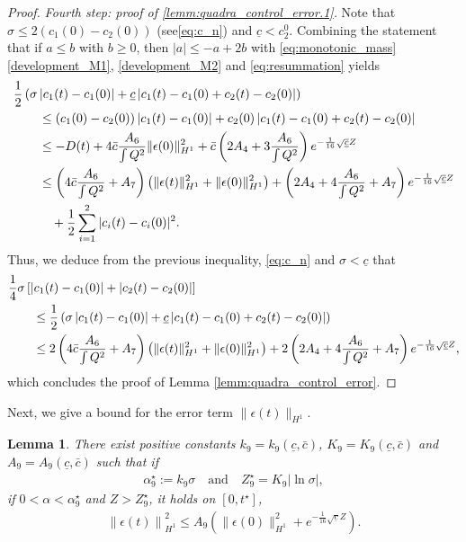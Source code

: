 \documentclass[reqno,10pt]{amsart}
\newtheorem{lemm}{Lemma}[section]
\numberwithin{equation}{section}
\begin{document}
\begin{proof}
\medskip
\noindent \textit{Fourth step: proof of \eqref{lemm:quadra_control_error.1}.} Note that  $\sigma \leq 2(c_1(0)-c_2(0))$ (see\eqref{eq:c_n}) and $\underline{c} < c_2^0$. Combining the statement that if $a \leq b$ with $b \geq 0$, then $\vert a \vert \leq -a +2b$ with  \eqref{eq:monotonic_mass}  \eqref{development_M1}, \eqref{development_M2} and \eqref{eq:resummation} yields
		\begin{align*}
			\MoveEqLeft
			\frac12 \left(\sigma \left\vert c_1(t) -c_1(0) \right\vert + \underline{c} \left\vert c_1(t) - c_1(0) + c_2(t) - c_2(0) \right\vert \right)\\
			& \leq \left( c_1(0) -c_2(0) \right) \left\vert c_1(t) - c_1(0) \right\vert + c_2(0) \left\vert c_1(t) - c_1(0) + c_2(t) - c_2(0) \right\vert \\
			& \leq  -D(t) + 4 \bar{c} \frac{A_6}{\int Q^2}  \| \epsilon (0) \|_{H^1}^2 + \bar{c} \left( 2 A_4 + 3 \frac{A_6}{\int Q^2} \right) e^{- \frac1{16} \sqrt{\underline{c}} Z} \\
			& \leq \left( 4 \bar{c} \frac{A_6}{\int Q^2} + A_7 \right) \left( \| \epsilon (t) \|_{H^1}^2 + \| \epsilon (0) \|_{H^1}^2 \right) + \left( 2 A_4 + 4 \frac{A_6}{\int Q^2} + A_7 \right) e^{- \frac1{16} \sqrt{\underline{c}} Z} \\
   & \quad + \frac12 \sum_{i=1}^2 \vert c_i(t) - c_i(0) \vert^2.
		\end{align*}
		Thus, we deduce from the previous inequality, \eqref{eq:c_n} and $\sigma <\underline{c}$ that
		\begin{align*}
			\MoveEqLeft
			\frac14 \sigma \left[ \vert c_1(t)-c_1(0) \vert + \vert c_2(t)- c_2(0) \vert \right] \\
			& \leq \frac12 \left( \sigma \left\vert c_1(t) - c_1(0) \right\vert + \underline{c} \left\vert c_1(t)- c_1(0) + c_2(t) -c_2(0) \right\vert \right) \\
			& \leq 2\left( 4 \bar{c} \frac{A_6}{\int Q^2} +A_7 \right) \left( \| \epsilon (t) \|_{H^1}^2 + \| \epsilon (0) \|_{H^1}^2 \right) + 2 \left( 2 A_4 + 4 \frac{A_6}{\int Q^2} + A_7 \right) e^{- \frac1{16} \sqrt{\underline{c}} Z},
		\end{align*}
		which concludes the proof of Lemma \ref{lemm:quadra_control_error}.
	\end{proof}
	
	Next, we give a bound for the error term $\|\epsilon(t)\|_{H^1}$. 
	\begin{lemm}\label{lemm:control_error}
		There exist positive constants $k_9=k_9(\underline{c}, \bar{c})$, $K_9=K_9(\underline{c}, \bar{c})$ and $A_9=A_9(\underline{c}, \bar{c})$ such that if
  \begin{align}\label{defi:alpha_9}
	\alpha_9^\star := k_9\sigma \quad \text{and} \quad Z_9^{\star}= K_9 |\ln \sigma|,
\end{align}
if $0<\alpha<\alpha_9^\star$ and $Z>Z_9^{\star}$, it holds on $[0,t^\star]$,
		\begin{align}\label{eq:control_eps}
			\left\| \epsilon(t) \right\|_{H^1}^2 \leq A_9 \left( \| \epsilon(0) \|_{H^1}^2 +  e^{-\frac1{16} \sqrt{\underline{c}}Z} \right).
		\end{align}
	\end{lemm}
\end{document}
